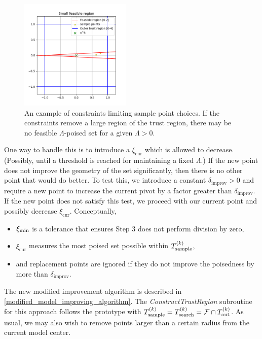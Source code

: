 \documentclass{article}
\begin{document}
\begin{figure}[ht]
    \centering
    \includegraphics[width=200px]{images/small_sample_region.png}
    \caption[An example of constraints limiting sample point choices.]
    	{An example of constraints limiting sample point choices.
    	If the constraints remove a large region of the trust region,
    	there may be no feasible $\Lambda$-poised set for a given $\Lambda>0$.
    }
    \label{lspc}
\end{figure}


One way to handle this is to introduce a $\xi_{\text{cur}}$ which is allowed to decrease.
(Possibly, until a threshold is reached for maintaining a fixed $\Lambda$.)
If the new point does not improve the geometry of the set significantly, then there is no other point that would do better.
To test this, we introduce a constant $\delta_{\text{improv}}>0$ and require a new point to increase the current pivot by a factor greater than $\delta_{\text{improv}}$.
If the new point does not satisfy this test, we proceed with our current point and possibly decrease $\xi_{\text{cur}}$.
Conceptually, 
\begin{itemize}
\item $\xi_{\text{min}}$ is a tolerance that ensures Step 3 does not perform division by zero,
\item $\xi_{\text{cur}}$ measures the most poised set possible within ${T_{\text{sample}}^{(k)}}$,
\item and replacement points are ignored if they do not improve the poisedness by more than $\delta_{\text{improv}}$.
\end{itemize}
The new modified improvement algorithm is described in \cref{modified_model_improving_algorithm}.
The \emph{ConstructTrustRegion} subroutine for this approach follows the prototype with ${T_{\text{sample}}^{(k)}} = {T_{\text{search}}^{(k)}} = {\mathcal F} \cap {T_{\text{out}}^{(k)}} $.
As usual, we may also wish to remove points larger than a certain radius from the current model center.
\end{document}
